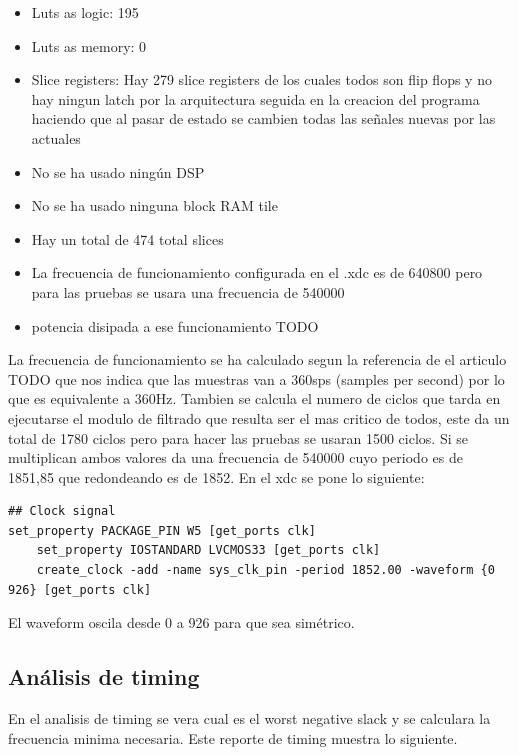	\begin{itemize}
		\item Luts as logic: 195
		\item Luts as memory: 0
		\item Slice registers: Hay 279 slice registers de los cuales todos son flip flops y no hay ningun latch por la arquitectura 
		seguida en la creacion del programa haciendo que al pasar de estado se cambien todas las señales nuevas por las actuales
		\item No se ha usado ningún DSP
		\item No se ha usado ninguna block RAM tile
		\item Hay un total de 474 total slices
		\item La frecuencia de funcionamiento configurada en el .xdc es de 640800 pero para las pruebas se usara una frecuencia de 540000
		\item potencia disipada a ese funcionamiento TODO
	\end{itemize}

	La frecuencia de funcionamiento se ha calculado segun la referencia de el articulo TODO que nos indica que las muestras van a 360sps (samples per second) 
	por lo que es equivalente a 360Hz. Tambien se calcula el numero de ciclos que tarda en ejecutarse el modulo de filtrado que resulta ser el mas critico 
	de todos, este da un total de 1780 ciclos pero para hacer las pruebas se usaran 1500 ciclos. Si se multiplican ambos valores da una frecuencia de 540000 
	cuyo periodo es de 1851,85 que redondeando es de 1852. En el xdc se pone lo siguiente:

	\lstset{language=VHDL, breaklines=true, basicstyle=\footnotesize}
\begin{lstlisting}[frame=single]
## Clock signal
set_property PACKAGE_PIN W5 [get_ports clk]							
	set_property IOSTANDARD LVCMOS33 [get_ports clk]
	create_clock -add -name sys_clk_pin -period 1852.00 -waveform {0 926} [get_ports clk]
\end{lstlisting}

El waveform oscila desde 0 a 926 para que sea simétrico.

\subsection{Análisis de timing}
	En el analisis de timing se vera cual es el worst negative slack y se calculara la frecuencia minima necesaria. Este reporte de timing muestra lo siguiente.

